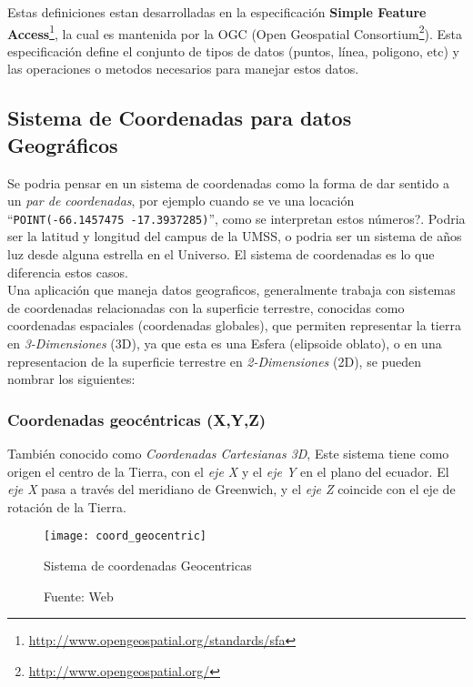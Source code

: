     Estas definiciones estan desarrolladas en la especificaci\'on \textbf{Simple Feature Access}\footnote{\url{http://www.opengeospatial.org/standards/sfa}}, la cual es mantenida por la OGC (Open Geospatial Consortium\footnote{\url{http://www.opengeospatial.org/}}). Esta especificaci\'on define el conjunto de tipos de datos (puntos, l\'inea, poligono, etc) y las operaciones o metodos necesarios para manejar estos datos.

  \subsection{Sistema de Coordenadas para datos Geográficos} %
  \label{sub:sistema_de_coordenadas_para_datos_geograficos}
    Se podria pensar en un sistema de coordenadas como la forma de dar sentido a un \emph{par de coordenadas}, por ejemplo cuando se ve una locaci\'on ``\verb|POINT(-66.1457475 -17.3937285)|'', como se interpretan estos n\'umeros?.
    Podria ser la latitud y longitud del campus de la UMSS, o podria ser un sistema de a\~nos luz desde alguna estrella en el Universo.
    El sistema de coordenadas es lo que diferencia estos casos.\\


    Una aplicaci\'on que maneja datos geograficos, generalmente trabaja con sistemas de coordenadas relacionadas con la superficie terrestre, conocidas como coordenadas espaciales (coordenadas globales), que permiten representar la tierra en \emph{3-Dimensiones} (3D), ya que esta es una Esfera (elipsoide oblato), o en una representacion de la superficie terrestre en \emph{2-Dimensiones} (2D), se pueden nombrar los siguientes:

    \subsubsection{Coordenadas geocéntricas (X,Y,Z)} %
      \label{subs:coordenadas_geocentricas}
        También conocido como \emph{Coordenadas Cartesianas 3D}, Este sistema tiene como origen el centro de la Tierra, con el \emph{eje X} y el \emph{eje Y} en el plano del ecuador. El \emph{eje X} pasa a través del meridiano de Greenwich, y el \emph{eje Z}  coincide con el eje de rotación de la Tierra.

        \begin{figure}[H]
          \begin{center}
            \texttt{[image: coord\_geocentric]}
            \caption{Sistema de coordenadas Geocentricas}
            \label{fig:coord_geocentric}
            \caption*{Fuente: Web}
          \end{center}
        \end{figure}

